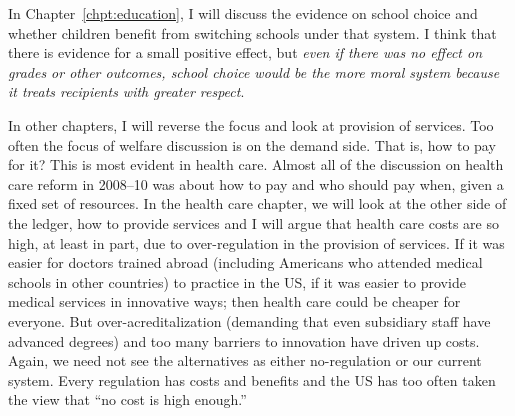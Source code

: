 In Chapter~\ref{chpt:education}, I will discuss the evidence on school choice
and whether children benefit from switching schools under that system. I think
that there is evidence for a small positive effect, but \emph{even if there was
no effect on grades or other outcomes, school choice would be the more moral
system because it treats recipients with greater respect}.

In other chapters, I will reverse the focus and look at provision of services.
Too often the focus of welfare discussion is on the demand side. That is, how
to pay for it? This is most evident in health care. Almost all of the
discussion on health care reform in 2008--10 was about how to pay and who
should pay when, given a fixed set of resources.  In the health care chapter,
we will look at the other side of the ledger, how to provide services and I
will argue that health care costs are so high, at least in part, due to
over-regulation in the provision of services. If it was easier for doctors
trained abroad (including Americans who attended medical schools in other
countries) to practice in the US, if it was easier to provide medical services
in innovative ways; then health care could be cheaper for everyone. But
over-acreditalization (demanding that even subsidiary staff have advanced
degrees) and too many barriers to innovation have driven up costs. Again, we
need not see the alternatives as either no-regulation or our current system.
Every regulation has costs and benefits and the US has too often taken the view
that ``no cost is high enough.''


